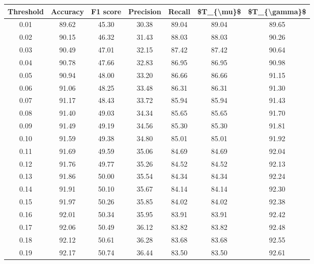 \begin{tabular}{|c|c|c|c|c|c|c|}
\hline
 Threshold &  Accuracy &  F1 score &  Precision &  Recall &  \$T\_\{\textbackslash mu\}\$ &  \$T\_\{\textbackslash gamma\}\$ \\
\hline
      0.01 &     89.62 &     45.30 &      30.38 &   89.04 &      89.04 &         89.65 \\
      0.02 &     90.15 &     46.32 &      31.43 &   88.03 &      88.03 &         90.26 \\
      0.03 &     90.49 &     47.01 &      32.15 &   87.42 &      87.42 &         90.64 \\
      0.04 &     90.78 &     47.66 &      32.83 &   86.95 &      86.95 &         90.98 \\
      0.05 &     90.94 &     48.00 &      33.20 &   86.66 &      86.66 &         91.15 \\
      0.06 &     91.06 &     48.25 &      33.48 &   86.31 &      86.31 &         91.30 \\
      0.07 &     91.17 &     48.43 &      33.72 &   85.94 &      85.94 &         91.43 \\
      0.08 &     91.40 &     49.03 &      34.34 &   85.65 &      85.65 &         91.70 \\
      0.09 &     91.49 &     49.19 &      34.56 &   85.30 &      85.30 &         91.81 \\
      0.10 &     91.59 &     49.38 &      34.80 &   85.01 &      85.01 &         91.92 \\
      0.11 &     91.69 &     49.59 &      35.06 &   84.69 &      84.69 &         92.04 \\
      0.12 &     91.76 &     49.77 &      35.26 &   84.52 &      84.52 &         92.13 \\
      0.13 &     91.86 &     50.00 &      35.54 &   84.34 &      84.34 &         92.24 \\
      0.14 &     91.91 &     50.10 &      35.67 &   84.14 &      84.14 &         92.30 \\
      0.15 &     91.97 &     50.26 &      35.85 &   84.02 &      84.02 &         92.38 \\
      0.16 &     92.01 &     50.34 &      35.95 &   83.91 &      83.91 &         92.42 \\
      0.17 &     92.06 &     50.49 &      36.12 &   83.82 &      83.82 &         92.48 \\
      0.18 &     92.12 &     50.61 &      36.28 &   83.68 &      83.68 &         92.55 \\
      0.19 &     92.17 &     50.74 &      36.44 &   83.50 &      83.50 &         92.61 \\

\end{tabular}
